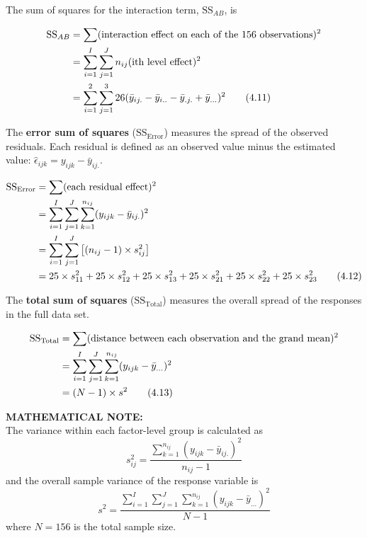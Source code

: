 \documentclass[
]{report}
\begin{document}
The sum of squares for the interaction term, \(\text{SS}_{AB}\), is

\begin{align}\label{4.11}
\text{SS}_{AB} &= \sum (\text{interaction effect on each of the 156 observations})^2 \notag \\
&= \sum_{i=1}^{I} \sum_{j=1}^{J} n_{ij} (\text{ith level effect})^2 \notag \\
&= \sum_{i=1}^{2} \sum_{j=1}^{3} 26 (\bar{y}_{ij.} - \bar{y}_{i..} - \bar{y}_{.j.} + \bar{y}_{...})^2
\tag{4.11}
\end{align}

The \textbf{error sum of squares} (\(\text{SS}_{\text{Error}}\)) measures the spread of the observed residuals. Each residual is defined as an observed value minus the estimated value: \(\hat{\epsilon}_{ijk} = y_{ijk} - \bar{y}_{ij.}\).

\begin{align}\label{4.12}
\text{SS}_{\text{Error}} &= \sum (\text{each residual effect})^2 \notag \\
&= \sum_{i=1}^{I} \sum_{j=1}^{J} \sum_{k=1}^{n_{ij}} (y_{ijk} - \bar{y}_{ij.})^2 \notag \\
&= \sum_{i=1}^{I} \sum_{j=1}^{J} \left[(n_{ij} - 1) \times s_{ij}^2 \right] \notag \\
&= 25 \times s_{11}^2 + 25 \times s_{12}^2 + 25 \times s_{13}^2 + 25 \times s_{21}^2 + 25 \times s_{22}^2 + 25 \times s_{23}^2
\tag{4.12}
\end{align}

The \textbf{total sum of squares} (\(\text{SS}_{\text{Total}}\)) measures the overall spread of the responses in the full data set.

\begin{align}\label{4.13}
\text{SS}_{\text{Total}} &= \sum (\text{distance between each observation and the grand mean})^2 \notag \\
&= \sum_{i=1}^{I} \sum_{j=1}^{J} \sum_{k=1}^{n_{ij}} (y_{ijk} - \bar{y}_{...})^2 \notag \\
&= (N-1) \times s^2
\tag{4.13}
\end{align}

\large

\textbf{MATHEMATICAL NOTE:}\\
The variance within each factor-level group is calculated as
\[
s_{ij}^2 = \frac{\sum_{k=1}^{n_{ij}} (y_{ijk} - \bar{y}_{ij.})^2}{n_{ij} - 1}
\]
and the overall sample variance of the response variable is
\[
s^2 = \frac{\sum_{i=1}^{I} \sum_{j=1}^{J} \sum_{k=1}^{n_{ij}} (y_{ijk} - \bar{y}_{...})^2}{N-1}
\]
where \(N = 156\) is the total sample size.
\normalsize
\end{document}
